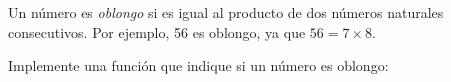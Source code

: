 \documentclass[11pt,spanish,a5paper,landscape]{article}
\begin{document}
  \thispagestyle{empty}

  Un número es \emph{oblongo}
  si es igual al producto de dos números naturales consecutivos.
  Por ejemplo, 56 es oblongo, ya que \(56 = 7\times 8\).

  Implemente una función que indique si un número es oblongo:

  
\end{document}
